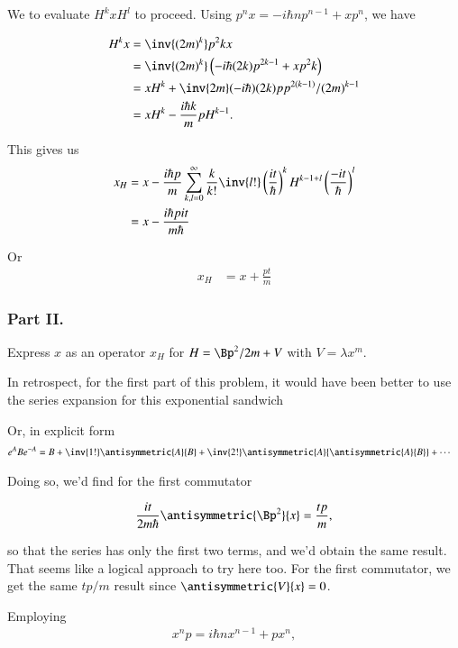 We to evaluate $H^k x H^l$ to proceed.  Using $p^n x = -i \hbar n p^{n-1} + x p^n$, we have

\begin{align*}
H^k x 
&= \inv{(2m)^k} p^2k x \\
&= \inv{(2m)^k} \left( -i \hbar (2k) p^{2k -1} + x p^2k \right) \\
&= x H^k + \inv{2m} (-i \hbar) (2k) p p^{2(k-1)}/(2m)^{k-1} \\
&= x H^k - \frac{i \hbar k}{m} p H^{k-1}.
\end{align*}

This gives us
\begin{align*}
x_H 
&= x - \frac{i \hbar p }{m} \sum_{k,l=0}^\infty \frac{k}{k!} \inv{l!}
\left(\frac{i t}{\hbar}\right)^k H^{k-1 + l}
\left(\frac{-i t}{\hbar}\right)^l  \\
&= x - \frac{i \hbar p i t }{m \hbar} 
\end{align*}

Or
\begin{align}\label{eqn:desaiCh3:303}
x_H 
&= x + \frac{p t }{m} 
\end{align}


\subsubsection{Part II.}
Express $x$ as an operator $x_H$ for $H = \Bp^2/2m + V$ with $V = \lambda x^m$.

In retrospect, for the first part of this problem, it would have been better to use the series expansion for this exponential sandwich

Or, in explicit form
\begin{align}\label{eqn:desaiCh3:304}
e^A B e^{-A}
&=
B 
+ \inv{1!} \antisymmetric{A}{B}
+ \inv{2!} 
\antisymmetric{A}{\antisymmetric{A}{B}}
+ \cdots
\end{align}

Doing so, we'd find for the first commutator

\begin{align}\label{eqn:desaiCh3:305}
\frac{i t}{2m \hbar} \antisymmetric{\Bp^2}{x} = \frac{t p}{m},
\end{align}

so that the series has only the first two terms, and we'd obtain the same result.  That seems like a logical approach to try here too.  For the first commutator, we get the same $tp/m$ result since $\antisymmetric{V}{x} = 0$.

Employing 
\begin{align}\label{eqn:desaiCh3:306}
x^n p = i \hbar n x^{n-1} + p x^n,
\end{align}

